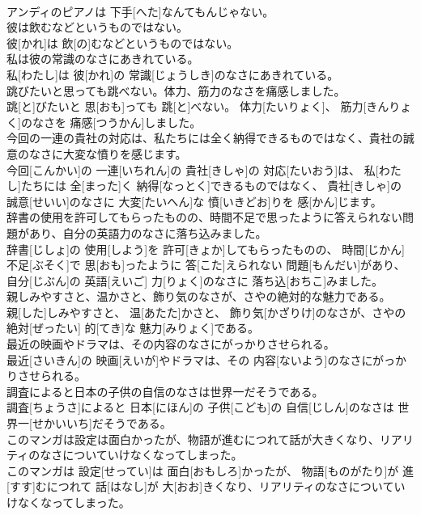\documentclass[8pt]{extreport}
\begin{document}
\begin{CJK}{UTF8}{min}
\\	アンディのピアノは 下手[へた]なんてもんじゃない。
\\	彼は飲むなどというものではない。	
\\	彼[かれ]は 飲[の]むなどというものではない。
\\	私は彼の常識のなさにあきれている。	
\\	私[わたし]は 彼[かれ]の 常識[じょうしき]のなさにあきれている。
\\	跳びたいと思っても跳べない。体力、筋力のなさを痛感しました。	
\\	跳[と]びたいと 思[おも]っても 跳[と]べない。 体力[たいりょく]、 筋力[きんりょく]のなさを 痛感[つうかん]しました。
\\	今回の一連の貴社の対応は、私たちには全く納得できるものではなく、貴社の誠意のなさに大変な憤りを感じます。	
\\	今回[こんかい]の 一連[いちれん]の 貴社[きしゃ]の 対応[たいおう]は、 私[わたし]たちには 全[まった]く 納得[なっとく]できるものではなく、 貴社[きしゃ]の 誠意[せいい]のなさに 大変[たいへん]な 憤[いきどお]りを 感[かん]じます。
\\	辞書の使用を許可してもらったものの、時間不足で思ったように答えられない問題があり、自分の英語力のなさに落ち込みました。	
\\	辞書[じしょ]の 使用[しよう]を 許可[きょか]してもらったものの、 時間[じかん] 不足[ぶそく]で 思[おも]ったように 答[こた]えられない 問題[もんだい]があり、 自分[じぶん]の 英語[えいご] 力[りょく]のなさに 落ち込[おちこ]みました。
\\	親しみやすさと、温かさと、飾り気のなさが、さやの絶対的な魅力である。	
\\	親[した]しみやすさと、 温[あたた]かさと、 飾り気[かざりけ]のなさが、さやの 絶対[ぜったい] 的[てき]な 魅力[みりょく]である。
\\	最近の映画やドラマは、その内容のなさにがっかりさせられる。	
\\	最近[さいきん]の 映画[えいが]やドラマは、その 内容[ないよう]のなさにがっかりさせられる。
\\	調査によると日本の子供の自信のなさは世界一だそうである。	
\\	調査[ちょうさ]によると 日本[にほん]の 子供[こども]の 自信[じしん]のなさは 世界一[せかいいち]だそうである。
\\	このマンガは設定は面白かったが、物語が進むにつれて話が大きくなり、リアリティのなさについていけなくなってしまった。	
\\	このマンガは 設定[せってい]は 面白[おもしろ]かったが、 物語[ものがたり]が 進[すす]むにつれて 話[はなし]が 大[おお]きくなり、リアリティのなさについていけなくなってしまった。

\end{CJK}
\end{document}
